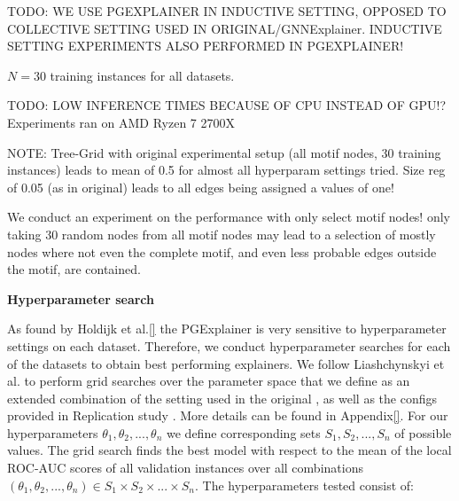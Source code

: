 TODO: WE USE PGEXPLAINER IN INDUCTIVE SETTING, OPPOSED TO COLLECTIVE SETTING USED IN ORIGINAL/GNNExplainer. INDUCTIVE SETTING EXPERIMENTS ALSO PERFORMED IN PGEXPLAINER!

$N=30$ training instances for all datasets.

TODO: LOW INFERENCE TIMES BECAUSE OF CPU INSTEAD OF GPU!?
Experiments ran on AMD Ryzen 7 2700X


NOTE: Tree-Grid with original experimental setup (all motif nodes, 30 training instances) leads to mean of 0.5 for almost all hyperparam settings tried. Size reg of 0.05 (as in original) leads to all edges being assigned a values of one!

We conduct an experiment on the performance with only select motif nodes! only taking 30 random nodes from all motif nodes may lead to a selection of mostly nodes where not even the complete motif, and even less probable edges outside the motif, are contained.

\textbf{Hyperparameter search}

As found by Holdijk et al.\ref{} the PGExplainer is very sensitive to hyperparameter settings on each dataset. Therefore, we conduct hyperparameter searches for each of the datasets to obtain best performing explainers. We follow Liashchynskyi et al. \cite{liashchynskyi2019grid} to perform grid searches over the parameter space that we define as an extended combination of the setting used in the original \cite{}, as well as the configs provided in Replication study \cite{}. More details can be found in Appendix\ref{}. For our hyperparameters $\theta_1,\theta_2,...,\theta_n$ we define corresponding sets $S_1,S_2,...,S_n$ of possible values. The grid search finds the best model with respect to the mean of the local ROC-AUC scores of all validation instances over all combinations $(\theta_1,\theta_2,...,\theta_n) \in S_1\times S_2 \times...\times S_n$. The hyperparameters tested consist of: 




